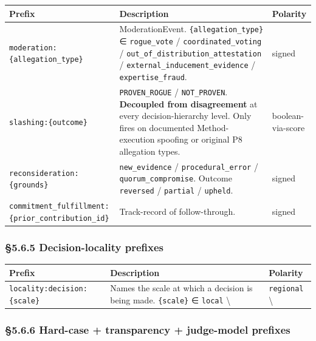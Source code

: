 \documentclass[10pt]{article}
\begin{document}
{\footnotesize
\begin{longtable}{|p{5.33cm}|p{5.33cm}|p{5.33cm}|}\hline
\textbf{Prefix} & \textbf{Description} & \textbf{Polarity} \\ \hline\endhead
\texttt{moderation:\{allegation\_type\}} & ModerationEvent. \texttt{\{allegation\_type\}} ∈ \texttt{rogue\_vote} / \texttt{coordinated\_voting} / \texttt{out\_of\_distribution\_attestation} / \texttt{external\_inducement\_evidence} / \texttt{expertise\_fraud}. & signed \\ \hline
\texttt{slashing:\{outcome\}} & \texttt{PROVEN\_ROGUE} / \texttt{NOT\_PROVEN}. \textbf{Decoupled from disagreement} at every decision-hierarchy level. Only fires on documented Method-execution spoofing or original P8 allegation types. & boolean-via-score \\ \hline
\texttt{reconsideration:\{grounds\}} & \texttt{new\_evidence} / \texttt{procedural\_error} / \texttt{quorum\_compromise}. Outcome \texttt{reversed} / \texttt{partial} / \texttt{upheld}. & signed \\ \hline
\texttt{commitment\_fulfillment:\{prior\_contribution\_id\}} & Track-record of follow-through. & signed \\ \hline
\end{longtable}}


\subsubsection*{§5.6.5 Decision-locality prefixes}


{\footnotesize
\begin{longtable}{|p{5.33cm}|p{5.33cm}|p{5.33cm}|}\hline
\textbf{Prefix} & \textbf{Description} & \textbf{Polarity} \\ \hline\endhead
\texttt{locality:decision:\{scale\}} & Names the scale at which a decision is being made. \texttt{\{scale\}} ∈ \texttt{local} \textbackslash{} & \texttt{regional} \textbackslash{} \\ \hline
\end{longtable}}


\subsubsection*{§5.6.6 Hard-case + transparency + judge-model prefixes}
\end{document}
